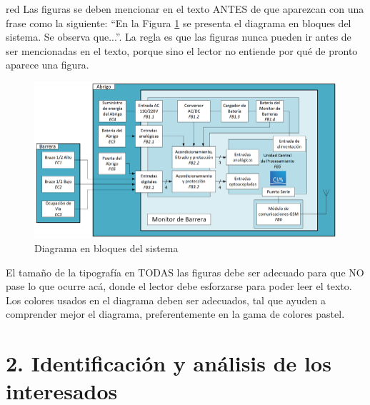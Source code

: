 \documentclass[
11pt, %
codirector, %
]{charter}
\begin{document}
\begin{consigna}{red}
Las figuras se deben mencionar en el texto ANTES de que aparezcan con una frase como la siguiente: ``En la Figura \ref{fig:diagBloques} se presenta el diagrama en bloques del sistema. Se observa que...''.  La regla es que las figuras nunca pueden ir antes de ser mencionadas en el texto, porque sino el lector no entiende por qué de pronto aparece una figura.

\begin{figure}[htpb]
\centering 
\includegraphics[width=.5\textwidth]{./Figuras/diagBloques.png}
\caption{Diagrama en bloques del sistema}
\label{fig:diagBloques}
\end{figure}

\vspace{25px}

El tamaño de la tipografía en TODAS las figuras debe ser adecuado para que NO pase lo que ocurre acá, donde el lector debe esforzarse para poder leer el texto. Los colores usados en el diagrama deben ser adecuados, tal que ayuden a comprender mejor el diagrama, preferentemente en la gama de colores pastel.
\end{consigna}

\section{2. Identificación y análisis de los interesados}
\label{sec:interesados}
\end{document}
